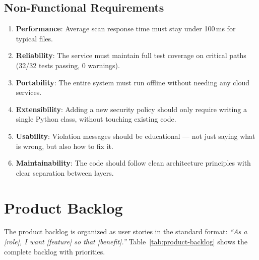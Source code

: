 \subsection{Non-Functional Requirements}

\begin{enumerate}[leftmargin=1.5cm, label=\textbf{NFR-\arabic*}]
  \item \textbf{Performance}: Average scan response time must stay under 100\,ms for typical files.
  \item \textbf{Reliability}: The service must maintain full test coverage on critical paths (32/32 tests passing, 0 warnings).
  \item \textbf{Portability}: The entire system must run offline without needing any cloud services.
  \item \textbf{Extensibility}: Adding a new security policy should only require writing a single Python class, without touching existing code.
  \item \textbf{Usability}: Violation messages should be educational --- not just saying what is wrong, but also how to fix it.
  \item \textbf{Maintainability}: The code should follow clean architecture principles with clear separation between layers.
\end{enumerate}


\section{Product Backlog}
\label{sec:backlog}

The product backlog is organized as user stories in the standard format: \emph{``As a [role], I want [feature] so that [benefit].''}  Table~\ref{tab:product-backlog} shows the complete backlog with priorities.

